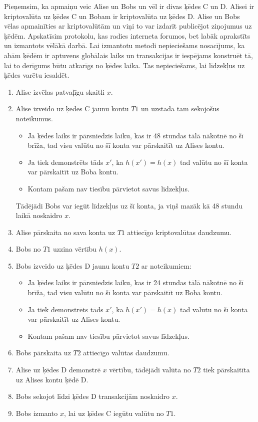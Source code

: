Pieņemsim, ka apmaiņu veic Alise un Bobs un vēl ir divas ķēdes C un D. Alisei ir kriptovalūta uz ķēdes C un Bobam ir kriptovalūta uz ķēdes D. Alise un Bobs vēlas apmainīties ar kriptovalūtām un viņi to var izdarīt publicējot ziņojumus uz ķēdēm. Apskatīsim protokolu, kas radies interneta forumos\cite{nolan13}, bet labāk aprakstīts un izmantots vēlākā darbā\cite{back14}. Lai izmantotu metodi nepieciešams nosacījums, ka abām ķēdēm ir aptuvens globālais laiks un transakcijas ir iespējams konstruēt tā, lai to derīgums būtu atkarīgs no ķēdes laika. Tas nepieciešams, lai līdzekļus uz ķēdes varētu iesaldēt.
\begin{enumerate}
    \item Alise izvēlas patvaļīgu skaitli $x$.
    \item Alise izveido uz ķēdes C jaunu kontu $T1$ un uzstāda tam sekojošus noteikumus.
        \begin{itemize}
            \item Ja ķēdes laiks ir pārsniedzis laiku, kas ir 48 stundas tālā nākotnē no šī brīža, tad visu valūtu no šī konta var pārskaitīt uz Alises kontu.
            \item Ja tiek demonstrēts tāds $x'$, ka $h(x') = h(x)$ tad valūtu no šī konta var pārskaitīt uz Boba kontu.
            \item Kontam pašam nav tiesību pārvietot savus līdzekļus.
        \end{itemize}
        Tādējādi Bobs var iegūt līdzekļus uz šī konta, ja viņš mazāk kā 48 stundu laikā noskaidro $x$.
    \item Alise pārskaita no sava konta uz $T1$ attiecīgo kriptovalūtas daudzumu.
    \item Bobs no $T1$ uzzina vērtību $h(x)$.
    \item Bobs izveido uz ķēdes D jaunu kontu $T2$ ar noteikumiem:
        \begin{itemize}
            \item Ja ķēdes laiks ir pārsniedzis laiku, kas ir 24 stundas tālā nākotnē no šī brīža, tad visu valūtu no šī konta var pārskaitīt uz Boba kontu.
            \item Ja tiek demonstrēts tāds $x'$, ka $h(x') = h(x)$ tad valūtu no šī konta var pārskaitīt uz Alises kontu.
            \item Kontam pašam nav tiesību pārvietot savus līdzekļus.
        \end{itemize}
    \item Bobs pārskaita uz $T2$ attiecīgo valūtas daudzumu.
    \item Alise uz ķēdes D demonstrē $x$ vērtību, tādējādi valūta no $T2$ tiek pārskaitīta uz Alises kontu ķēdē D.
    \item Bobs sekojot līdzi ķēdes D transakcijām noskaidro $x$.
    \item Bobs izmanto $x$, lai uz ķēdes C iegūtu valūtu no $T1$.
\end{enumerate}
